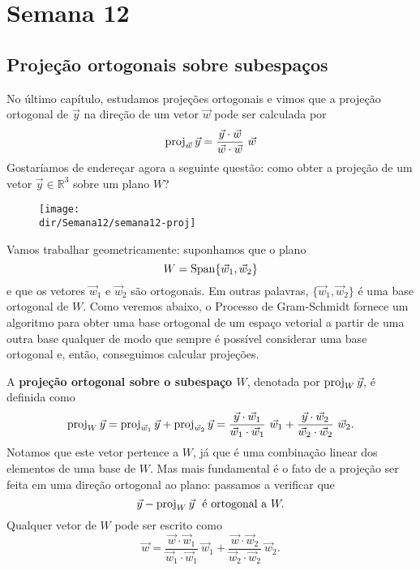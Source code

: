 \documentclass[../livro.tex]{subfiles}  %
\providecommand{\dir}{..}
\begin{document}
	
	\chapter{Semana 12}

\section{Projeção ortogonais sobre subespaços}

No último capítulo, estudamos projeções ortogonais e vimos que a projeção ortogonal de $\vec{y}$ na direção de um vetor $\vec{w}$ pode ser calculada por
\begin{equation}
\proj_{\vec{w}} \vec{y} = \frac{\vec{y} \cdot \vec{w}}{\vec{w} \cdot \vec{w}} \ \vec{w}
\end{equation} Gostaríamos de endereçar agora a seguinte questão: como obter a projeção de um vetor $\vec{y} \in \mathbb{R}^3$ sobre um plano $W$?

\begin{figure}[h!]
\begin{center}
\texttt{[image: \\dir/Semana12/semana12-proj]}
\end{center}
\end{figure}
\noindent Vamos trabalhar geometricamente: suponhamos que o plano
\begin{equation}
W = \operatorname{Span} \{\vec{w}_1, \vec{w}_2\}
\end{equation} e que os vetores $\vec{w}_1$ e $\vec{w}_2$ são ortogonais. Em outras palavras, $\{\vec{w}_1, \vec{w}_2\}$ é uma base ortogonal de $W$. Como veremos abaixo, o Processo de Gram-Schmidt fornece um algoritmo para obter uma base ortogonal de um espaço vetorial a partir de uma outra base qualquer de modo que sempre é possível considerar uma base ortogonal e, então, conseguimos calcular projeções.

A \textbf{projeção ortogonal sobre o subespaço $W$}, denotada por $\operatorname{proj}_W \vec{y}$, é definida como
\begin{equation}
\operatorname{proj}_W \vec{y} = \operatorname{proj}_{\vec{w}_1} \vec{y} + \operatorname{proj}_{\vec{w}_2} \vec{y} = \frac{\vec{y} \cdot \vec{w}_1}{\vec{w}_1 \cdot \vec{w}_1} \ \vec{w}_1 + \frac{\vec{y} \cdot \vec{w}_2}{\vec{w}_2 \cdot \vec{w}_2} \ \vec{w}_2.
\end{equation} Notamos que este vetor pertence a $W$, já que é uma combinação linear dos elementos de uma base de $W$. Mas mais fundamental é o fato de a projeção ser feita em uma direção ortogonal ao plano: passamos a verificar que
\begin{equation}
\vec{y} - \operatorname{proj}_W \vec{y} \ \text{ é ortogonal a }  W.
\end{equation} Qualquer vetor de $W$ pode ser escrito como
\begin{equation}
\vec{w} = \frac{\vec{w} \cdot \vec{w}_1}{\vec{w}_1 \cdot \vec{w}_1} \ \vec{w}_1 + \frac{\vec{w} \cdot \vec{w}_2}{\vec{w}_2 \cdot \vec{w}_2} \ \vec{w}_2.
\end{equation}
\end{document}
